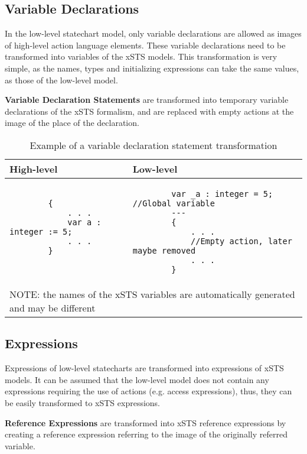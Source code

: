 \subsection{Variable Declarations}
In the low-level statechart model, only variable declarations are allowed as images of high-level action language elements. These variable declarations need to be transformed into variables of the xSTS models. This transformation is very simple, as the names, types and initializing expressions can take the same values, as those of the low-level model. 

\bigskip
\textbf{Variable Declaration Statements} are transformed into temporary variable declarations of the xSTS formalism, and are replaced with empty actions at the image of the place of the declaration. 

\begin{table}[h!]
	\footnotesize
	\centering
	\begin{tabular}{ p{7cm} p{7cm} }
		\toprule
		High-level & Low-level \\
		\midrule
		\begin{lstlisting}
		{
			. . .
			var a : integer := 5;
			. . .
		}
		
		\end{lstlisting} & 
		\begin{lstlisting}
		var _a : integer = 5;	//Global variable
		---
		{
			. . . 
			//Empty action, later maybe removed
			. . .
		}\end{lstlisting} \\
		\bottomrule
		\multicolumn{2}{l}{NOTE: the names of the xSTS variables are automatically generated and may be different}
	\end{tabular}
	\caption{Example of a variable declaration statement transformation}
	\label{tab:LLXSTSVariableDeclarationExample}
\end{table}

\subsection{Expressions}
Expressions of low-level statecharts are transformed into expressions of xSTS models. It can be assumed that the low-level model does not contain any expressions requiring the use of actions (e.g. access expressions), thus, they can be easily transformed to xSTS expressions.

\bigskip
\textbf{Reference Expressions} are transformed into xSTS reference expressions by creating a reference expression referring to the image of the originally referred variable.


